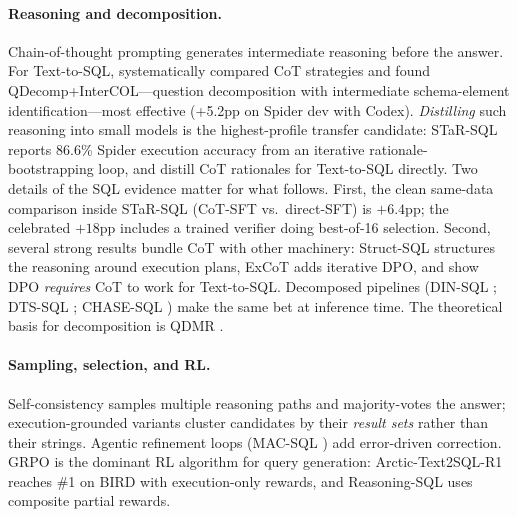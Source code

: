 \documentclass[11pt]{article}
\begin{document}
\paragraph{Reasoning and decomposition.} Chain-of-thought prompting \citep{wei2022cot} generates
intermediate reasoning before the answer. For Text-to-SQL, \citet{tai2023cot} systematically compared
CoT strategies and found QDecomp+InterCOL---question decomposition with intermediate schema-element
identification---most effective (+5.2pp on Spider dev with Codex). \emph{Distilling} such reasoning
into small models is the highest-profile transfer candidate: STaR-SQL \citep{he2025starsql} reports
86.6\% Spider execution accuracy from an iterative rationale-bootstrapping loop, and
\citet{rossiello2025rationalization} distill CoT rationales for Text-to-SQL directly. Two details of
the SQL evidence matter for what follows. First, the clean same-data comparison inside STaR-SQL
(CoT-SFT vs.\ direct-SFT) is $+6.4$pp; the celebrated $+18$pp includes a trained verifier doing
best-of-16 selection. Second, several strong results bundle CoT with other machinery: Struct-SQL
\citep{thaker2025structsql} structures the reasoning around execution plans, ExCoT \citep{yao2025excot}
adds iterative DPO, and \citet{liu2025dpo} show DPO \emph{requires} CoT to work for Text-to-SQL.
Decomposed pipelines (DIN-SQL \citealt{pourreza2023dinsql}; DTS-SQL \citealt{pourreza2024dtssql};
CHASE-SQL \citealt{pourreza2025chasesql}) make the same bet at inference time. The theoretical basis
for decomposition is QDMR \citep{wolfson2020break, wolfson2022weakly}.

\paragraph{Sampling, selection, and RL.} Self-consistency \citep{wang2022selfconsistency} samples
multiple reasoning paths and majority-votes the answer; execution-grounded variants cluster candidates
by their \emph{result sets} rather than their strings. Agentic refinement loops (MAC-SQL
\citealt{macsql2025}) add error-driven correction. GRPO \citep{shao2024deepseekmath} is the dominant
RL algorithm for query generation: Arctic-Text2SQL-R1 \citep{yao2025arctic} reaches \#1 on BIRD with
execution-only rewards, and Reasoning-SQL \citep{pourreza2025reasoning} uses composite partial rewards.
\end{document}
